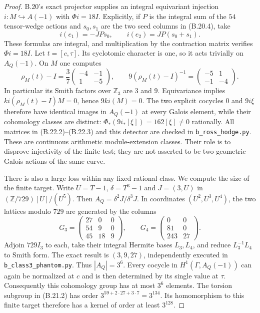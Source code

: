 \begin{proof}
B.20's exact projector supplies an integral equivariant
injection $i:M\hookrightarrow A(-1)$ with
$\Phi i=18I$. Explicitly, if $P$ is the integral sum
of the $54$ tensor-wedge actions and $s_0,s_1$ are the
two seed columns in (B.20.4), take
\[
 i(e_1)=-JP s_0,\qquad i(e_2)=JP(s_0+s_1).
                                                               \tag{B.22.2}
\]
These formulas are integral, and multiplication by the
contraction matrix verifies $\Phi i=18I$.
Let $t=[c,\tau]$. Its cyclotomic character is one, so
it acts trivially on $A_Q(-1)$. On $M$ one computes
\[
 \rho_M(t)-I=\frac37
                  \begin{pmatrix}-4&-1\\1&-5\end{pmatrix},
 \qquad
 9(\rho_M(t)-I)^{-1}
                  =\begin{pmatrix}-5&1\\-1&-4\end{pmatrix}.
                                                               \tag{B.22.3}
\]
In particular its Smith factors over $\mathbb Z_3$
are $3$ and $9$. Equivariance implies
$ki(\rho_M(t)-I)M=0$, hence $9ki(M)=0$.
The two explicit cocycles $0$ and $9i\xi$ therefore
have identical images in $A_Q(-1)$ at every Galois
element, while their cohomology classes are distinct:
$\Phi_*(9i_*[\xi])=162[\xi]\ne0$ rationally.
All matrices in (B.22.2)--(B.22.3) and this detector
are checked in \texttt{b\_ross\_hodge.py}.
These are continuous arithmetic module-extension
classes. Their role is to disprove injectivity of the
finite test; they are not asserted to be two geometric
Galois actions of the same curve.

There is also a large loss within any fixed rational
class. We compute the size of the finite target.
Write $U=T-1$, $\delta=T^3-1$ and
$J=(3,U)$ in $(\mathbb Z/729)[U]/(U^5)$.
Then $A_Q=\delta^2J/\delta^3J$. In coordinates
$(U^2,U^3,U^4)$, the two lattices modulo $729$ are
generated by the columns
\[
 G_3=\begin{pmatrix}27&0&0\\54&9&0\\45&18&9\end{pmatrix},
 \qquad
 G_4=\begin{pmatrix}0&0\\81&0\\243&27\end{pmatrix}.
\]
Adjoin $729I_3$ to each, take their integral Hermite
bases $L_3,L_4$, and reduce $L_3^{-1}L_4$ to Smith
form. The exact result is $(3,9,27)$, independently
executed in \texttt{b\_class3\_phantom.py}. Thus
$|A_Q|=3^6$.
Every cocycle in $H^1(\Gamma,A_Q(-1))$ can again be
normalized at $c$ and is then determined by its single
value at $\tau$. Consequently this cohomology group
has at most $3^6$ elements. The torsion subgroup in
(B.21.2) has order $3^{59+2\cdot27+3\cdot7}=3^{134}$.
Its homomorphism to this finite target therefore has
a kernel of order at least $3^{128}$.


\end{proof}
